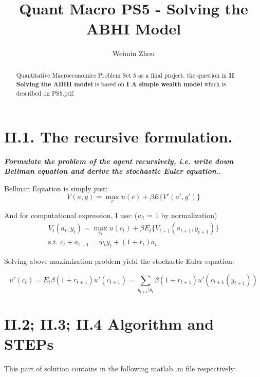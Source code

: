 \documentclass{article}[a4paper]
\title{Quant Macro PS5 - Solving the ABHI Model}
\author{Weimin Zhou}
\begin{document}
\maketitle
\begin{abstract}
	Quantitative Macroeconomics Problem Set 5 as a final project.
	the question in \textbf{II Solving the ABHI model} is based on \textbf{I A simple wealth model} which is described on PS5.pdf. 
\end{abstract}

\tableofcontents

\pagebreak 

\section{II.1. The recursive formulation.}
\textbf{\textit{Formulate the problem of the agent recursively, i.e. write down Bellman equation and derive the
stochastic Euler equation.}}.

Bellman Equation is simply just:
\begin{equation}
V(a, y)  = \max_{c} u(c) + \beta E \{ V'(a',y')\}
\end{equation}

And for computational expression, I use: ($w_t$ = 1 by normalization)
\begin{align}
V_t (a_t, y_t)  = \max_{c_t} u(c_t) + \beta E_t \{ V_{t+1}(a_{t+1},y_{t+1})\} \\
\text{s.t. } c_t + a_{t+1} = w_t y_t + (1+r_t) a_t
\end{align}

Solving above maximization problem yield the stochastic Euler equation:

\begin{equation}
u'(c_t)  = E_t \beta (1+r_{t+1})u'(c_{t+1}) = \sum_{y_{t+1}|y_t} \beta (1+r_{t+1}) u'(c_{t+1}(y_{t+1}))
\end{equation}

\section{II.2; II.3; II.4 Algorithm and STEPs}

This part of solution contains in the following matlab .m file respectively:
\end{document}
